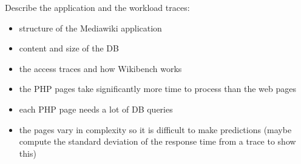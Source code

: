 Describe the application and the workload traces: 


\begin{itemize}
\item structure of the Mediawiki application
\item content and size of the DB
\item the access traces and how Wikibench works
\end{itemize}

\begin{itemize}
\item the PHP pages take significantly more time to process
than the web pages
\item each PHP page needs a lot of DB queries 
\item the pages vary in complexity so it is difficult to make
predictions (maybe compute the standard deviation of the response time
from a trace to show this)
\end{itemize}